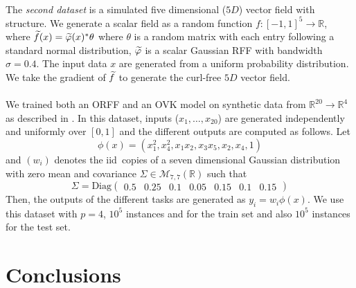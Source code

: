 \paragraph{}
The \emph{second dataset} is a simulated five dimensional ($5D$) vector field
with structure. We generate a scalar field as a random function
$f:[-1,1]^5\to\mathbb{R}$, where
$\widetilde{f}(x)=\widetilde{\varphi}(x)^* \theta$ where $\theta$ is a
random matrix with each entry following a standard normal distribution,
$\widetilde{\varphi}$ is a scalar Gaussian RFF with bandwidth $\sigma=0.4$. The
input data $x$ are generated from a uniform probability distribution. We take
the gradient of $\widetilde{f}$ to generate the curl-free $5D$ vector field.


\paragraph{}
We trained both an \ac{ORFF} and an \ac{OVK} model on synthetic data from
$\mathbb{R}^{20}\to\mathbb{R}^4$ as described in \citet{audiffren2013online}.
In this dataset, inputs ($x_1, \hdots, x_{20}$) are generated independently and
uniformly over $[0, 1]$ and the different outputs are computed as follows. Let
\begin{dmath*}
    \phi(x)=(x_1^2, x_4^2, x_1x_2, x_3x_5, x_2, x_4, 1)
\end{dmath*}
and $(w_i)$ denotes the \acs{iid}~copies of a seven dimensional Gaussian
distribution with zero mean and covariance
$\Sigma\in\mathcal{M}_{7,7}(\mathbb{R})$ such that
\begin{dmath*}
    \Sigma=\text{Diag}
    \begin{pmatrix}
        0.5 & 0.25 & 0.1 & 0.05 & 0.15 & 0.1 & 0.15
    \end{pmatrix}
\end{dmath*}
Then, the outputs of the different tasks are generated as $y_i=w_i\phi(x)$. We
use this dataset with $p=4$, $10^5$ instances and for the train set and also
$10^5$ instances for the test set.

\section{Conclusions}
\label{sec:conclusions_learning}

\chapterend
